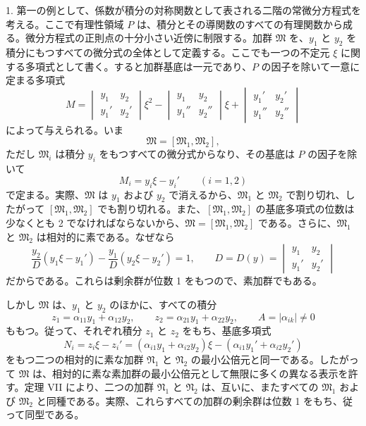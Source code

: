 1. 第一の例として、係数が積分の対称関数として表される二階の常微分方程式を考える。ここで有理性領域 $P$ は、積分とその導関数のすべての有理関数から成る。微分方程式の正則点の十分小さい近傍に制限する。加群 $\mathfrak M$ を、$y_1$ と $y_2$ を積分にもつすべての微分式の全体として定義する。ここでも一つの不定元 $\xi$ に関する多項式として書く。すると加群基底は一元であり、$P$ の因子を除いて一意に定まる多項式
\[
 M=
 \begin{vmatrix} y_1&y_2\\ y_1'&y_2'\end{vmatrix}\xi^2
 -\begin{vmatrix} y_1&y_2\\ y_1''&y_2''\end{vmatrix}\xi
 +\begin{vmatrix} y_1'&y_2'\\ y_1''&y_2''\end{vmatrix}
\]
によって与えられる。いま
\begin{equation}
 \mathfrak M=[\mathfrak M_1,
\mathfrak M_2],
\tag{41}
\end{equation}
ただし $\mathfrak M_i$ は積分 $y_i$ をもつすべての微分式からなり、その基底は $P$ の因子を除いて
\[
 M_i=y_i\xi-y_i'
 \qquad(i=1,2)
\]
で定まる。実際、$\mathfrak M$ は $y_1$ および $y_2$ で消えるから、$\mathfrak M_1$ と $\mathfrak M_2$ で割り切れ、したがって $[\mathfrak M_1,\mathfrak M_2]$ でも割り切れる。また、$[\mathfrak M_1,\mathfrak M_2]$ の基底多項式の位数は少なくとも 2 でなければならないから、$\mathfrak M=[\mathfrak M_1,\mathfrak M_2]$ である。さらに、$\mathfrak M_1$ と $\mathfrak M_2$ は相対的に素である。なぜなら
\begin{equation}
 \frac{y_2}{D}(y_1\xi-y_1')-\frac{y_1}{D}(y_2\xi-y_2')=1,
 \qquad
 D=D(y)=\begin{vmatrix}y_1&y_2\\ y_1'&y_2'\end{vmatrix}
\tag{42}
\end{equation}
だからである。これらは剰余群が位数 1 をもつので、素加群でもある。

しかし $\mathfrak M$ は、$y_1$ と $y_2$ のほかに、すべての積分
\[
 z_1=\alpha_{11}y_1+\alpha_{12}y_2,
 \qquad
 z_2=\alpha_{21}y_1+\alpha_{22}y_2,
 \qquad
 A=|\alpha_{ik}|\ne0
\]
ももつ。従って、それぞれ積分 $z_1$ と $z_2$ をもち、基底多項式
\[
 N_i=z_i\xi-z_i'=(\alpha_{i1}y_1+\alpha_{i2}y_2)\xi-(\alpha_{i1}y_1'+\alpha_{i2}y_2')
\]
をもつ二つの相対的に素な加群 $\mathfrak N_1$ と $\mathfrak N_2$ の最小公倍元と同一である。したがって $\mathfrak M$ は、相対的に素な素加群の最小公倍元として無限に多くの異なる表示を許す。定理 VII により、二つの加群 $\mathfrak N_1$ と $\mathfrak N_2$ は、互いに、またすべての $\mathfrak M_1$ および $\mathfrak M_2$ と同種である。実際、これらすべての加群の剰余群は位数 1 をもち、従って同型である。

